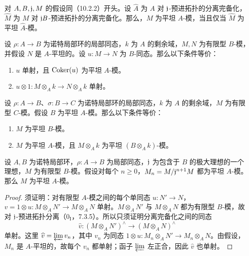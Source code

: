 对 $A,B,\mathfrak j,M$ 的假设同（10.2.2）开头。设 $\widehat A$ 为 $A$ 对 $\mathfrak j$-预进拓扑的分离完备化，$\widehat M$ 为 $M$ 对 $\mathfrak j B$-预进拓扑的分离完备化。那么，$M$ 为平坦 $A$-模，当且仅当 $\widehat M$ 为平坦 $\widehat A$-模。

设 $\rho:A\to B$ 为诺特局部环的局部同态，$k$ 为 $A$ 的剩余域，$M,N$ 为有限型 $B$-模，并假设 $N$ 是 $A$-平坦的。设 $u:M\to N$ 为 $B$-同态。那么以下条件等价：
\begin{enumerate}[label=\alph*)]
\item $u$ 单射，且 $\operatorname{Coker}(u)$ 为平坦 $A$-模。
\item $u\otimes1:M\otimes_Ak\to N\otimes_Ak$ 单射。
\end{enumerate}

设 $\rho:A\to B$、$\sigma:B\to C$ 为诺特局部环的局部同态，$k$ 为 $A$ 的剩余域，$M$ 为有限型 $C$-模。假设 $B$ 为平坦 $A$-模。那么以下条件等价：
\begin{enumerate}[label=\alph*)]
\item $M$ 为平坦 $B$-模。
\item $M$ 为平坦 $A$-模，且 $M\otimes_Ak$ 为平坦 $(B\otimes_Ak)$-模。
\end{enumerate}

设 $A,B$ 为诺特局部环，$\rho:A\to B$ 为局部同态，$\mathfrak j$ 为包含于 $B$ 的极大理想的一个理想，$M$ 为有限型 $B$-模。假设对每个 $n\geq0$，$M_n=M/\mathfrak j^{n+1}M$ 都为平坦 $A$-模。那么 $M$ 为平坦 $A$-模。
\begin{proof}
须证明：对有限型 $A$-模之间的每个单同态 $u:N'\to N$，$v=1\otimes u:M\otimes_AN'\to M\otimes_AN$ 单射。$M\otimes_AN'$ 与 $M\otimes_AN$ 都为有限型 $B$-模，故对 $\mathfrak j$-预进拓扑分离（$0_{\mathrm I}$，7.3.5）。所以只须证明分离完备化之间的同态
\[
\widehat v:(M\otimes_AN')^{\wedge}\longrightarrow(M\otimes_AN)^{\wedge}
\]
单射。这里 $\widehat v=\varprojlim v_n$，其中 $v_n$ 为同态 $1\otimes u:M_n\otimes_AN'\to M_n\otimes_AN$。由假设，$M_n$ 是 $A$-平坦的，故每个 $v_n$ 都单射；函子 $\varprojlim$ 左正合，因此 $\widehat v$ 也单射。
\end{proof}

